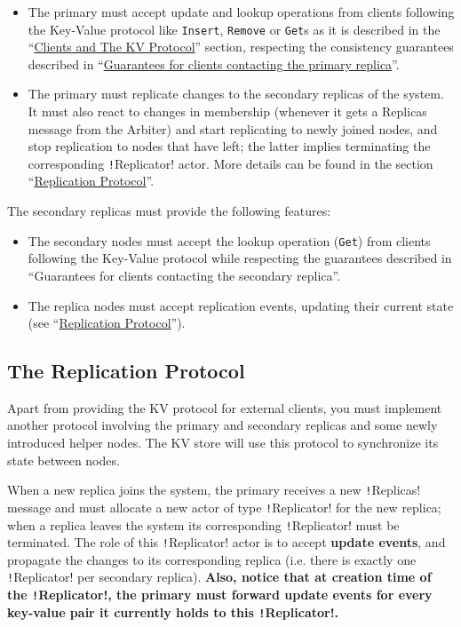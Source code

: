 \documentclass{article}
\begin{document}
\begin{itemize}
    \item The primary must accept update and lookup operations from clients following the Key-Value protocol like \texttt{Insert}, \texttt{Remove} or \texttt{Get}s as it is described in the “\hyperref[ss:clientsandkv]{Clients and The KV Protocol}” section, respecting the consistency guarantees described in “\hyperref[ss:orderingguaranteesprimary]{Guarantees for clients contacting the primary replica}”.
    \item The primary must replicate changes to the secondary replicas of the system. It must also react to changes in membership (whenever it gets a Replicas message from the Arbiter) and start replicating to newly joined nodes, and stop replication to nodes that have left; the latter implies terminating the corresponding \texttt!Replicator! actor. More details can be found in the section ``\hyperref[ss:replicationprotocol]{Replication Protocol}''.
\end{itemize}

The secondary replicas must provide the following features:

\begin{itemize}
    \item The secondary nodes must accept the lookup operation (\texttt{Get}) from clients following the Key-Value protocol while respecting the guarantees described in “Guarantees for clients contacting the secondary replica”.
    \item The replica nodes must accept replication events, updating their current state (see “\hyperref[ss:replicationprotocol]{Replication Protocol}”).
\end{itemize}

\subsection{The Replication Protocol}\label{ss:replicationprotocol}

Apart from providing the KV protocol for external clients, you must implement another protocol involving the primary and secondary replicas and some newly introduced helper nodes. The KV store will use this protocol to synchronize its state between nodes.

When a new replica joins the system, the primary receives a new \texttt!Replicas! message and must allocate a new actor of type \texttt!Replicator! for the new replica; when a replica leaves the system its corresponding \texttt!Replicator! must be terminated. The role of this \texttt!Replicator! actor is to accept \textbf{update events}, and propagate the changes to its corresponding replica (i.e. there is exactly one \texttt!Replicator! per secondary replica). \textbf{Also, notice that at creation time of the \texttt!Replicator!, the primary must forward update events for every key-value pair it currently holds to this \texttt!Replicator!.}
\end{document}

